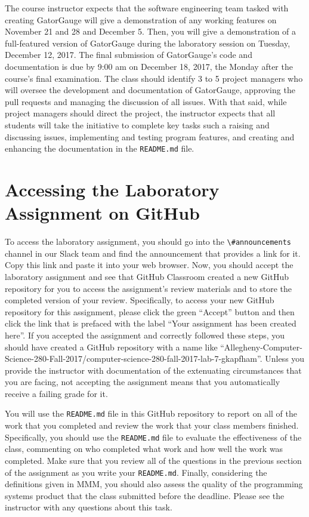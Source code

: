 \documentclass[11pt]{article}
\newcommand{\reflection}{\lstinline{README.md}}
\newcommand{\program}[1]{\lstinline{#1}}
\newcommand{\channel}[1]{\lstinline{#1}}
\begin{document}
The course instructor expects that the software engineering team tasked with creating GatorGauge will give a
demonstration of any working features on November 21 and 28 and December 5. Then, you will give a demonstration of a
full-featured version of GatorGauge during the laboratory session on Tuesday, December 12, 2017. The final submission of
GatorGauge's code and documentation is due by 9:00 am on December 18, 2017, the Monday after the course's final
examination. The class should identify 3 to 5 project managers who will oversee the development and documentation of
GatorGauge, approving the pull requests and managing the discussion of all issues. With that said, while project
managers should direct the project, the instructor expects that all students will take the initiative to complete key
tasks such a raising and discussing issues, implementing and testing program features, and creating and enhancing the
documentation in the \program{README.md} file.

\section*{Accessing the Laboratory Assignment on GitHub}

To access the laboratory assignment, you should go into the \channel{\#announcements} channel in our Slack team and find
the announcement that provides a link for it. Copy this link and paste it into your web browser. Now, you should accept
the laboratory assignment and see that GitHub Classroom created a new GitHub repository for you to access the
assignment's review materials and to store the completed version of your review. Specifically, to access your new GitHub
repository for this assignment, please click the green ``Accept'' button and then click the link that is prefaced with
the label ``Your assignment has been created here''. If you accepted the assignment and correctly followed these steps,
you should have created a GitHub repository with a name like
``Allegheny-Computer-Science-280-Fall-2017/computer-science-280-fall-2017-lab-7-gkapfham''. Unless you provide the
instructor with documentation of the extenuating circumstances that you are facing, not accepting the assignment means
that you automatically receive a failing grade for it.

You will use the \reflection{} file in this GitHub repository to report on all of the work that you completed and review
the work that your class members finished. Specifically, you should use the \reflection{} file to evaluate the
effectiveness of the class, commenting on who completed what work and how well the work was completed. Make sure that
you review all of the questions in the previous section of the assignment as you write your \reflection{}. Finally,
considering the definitions given in MMM, you should also assess the quality of the programming systems product that the
class submitted before the deadline. Please see the instructor with any questions about this task.
\end{document}

